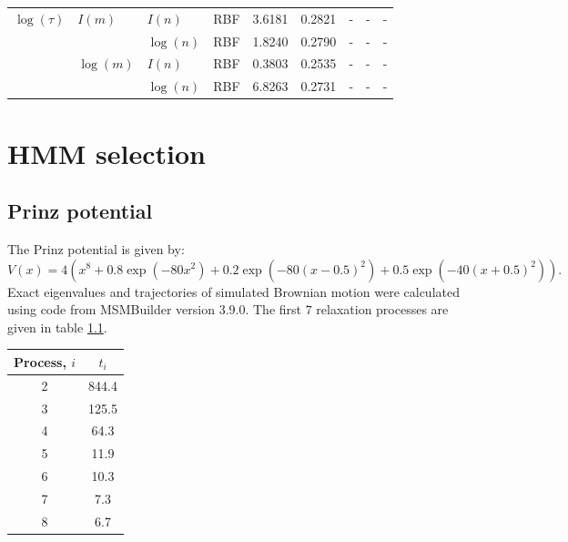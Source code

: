\begin{table}
\begin{tabularx}{1\textwidth}{|llllrr >{\raggedright\arraybackslash}X>{\raggedright\arraybackslash}X>{\raggedright\arraybackslash}X|}
    $\log({\tau})$ & $I({m})$ & $I({n})$ & RBF &  3.6181 & 0.2821 &           - &           - &            - \\
                   &             & $\log({n})$ & RBF &  1.8240 & 0.2790 &           - &           - &            - \\
                   & $\log({m})$ & $I({n})$ & RBF &  0.3803 & 0.2535 &           - &           - &            - \\
                   &             & $\log({n})$ & RBF &  6.8263 & 0.2731 &           - &           - &            - \\
    \hline
    \end{tabularx}
\end{table}

\chapter{HMM selection}\label{app:hmm}

\section{Prinz potential}
 The Prinz potential is given by: 
\begin{equation}\label{eqn:prinz_pot}
       V(x) = 4\left(x^8 + 0.8 \exp{\left(-80 x^2\right)} + 0.2 \exp{\left(-80 (x-0.5)^2\right)} + 0.5\exp{\left(-40 (x+0.5)^2\right)}\right).
\end{equation}
Exact eigenvalues and trajectories of simulated Brownian motion were calculated using code from MSMBuilder \cite{beauchampMSMBuilder2ModelingConformational2011} version 3.9.0.  The first $7$ relaxation processes are given in table \ref{tab:prinz_its_exact}. 
\begin{table}
    \centering
    \begin{tabular}{|c|c|}
        \hline
        Process, $i$ & $t_i$ \\
        \hline\hline
         2 & 844.4 \\
         3 & 125.5 \\
         4 & 64.3 \\
         5 & 11.9 \\
         6 & 10.3 \\
         7 & 7.3 \\
         8 & 6.7 \\
         \hline
    \end{tabular}
    \label{tab:prinz_its_exact}
\end{table}

